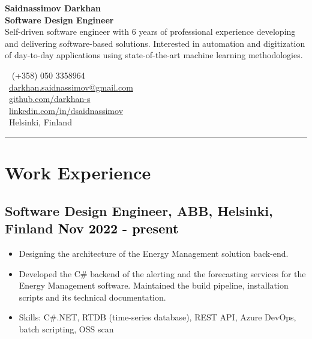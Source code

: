 \documentclass[a4paper,10pt]{article}
\begin{document}

\noindent
\begin{minipage}[t]{0.65\textwidth} %
    {\color{darkblue}\textbf{\LARGE Saidnassimov Darkhan}} \\[0.2cm]
    \textbf{\large Software Design Engineer} \\[0.2cm]
    Self-driven software engineer with 6 years of professional experience developing and delivering software-based solutions. Interested in automation and digitization of day-to-day applications using state-of-the-art machine learning methodologies.
\end{minipage}
\hfill
\begin{minipage}[t]{0.32\textwidth} %
    \vspace{0.5cm} 
    \raggedleft 
    \footnotesize 
    \faBriefcase\ \; (+358) 050 3358964 \\[0.2cm]  
    \faEnvelope\ \href{mailto:darkhan.saidnassimov@gmail.com}{\mbox{darkhan.saidnassimov@gmail.com}} \\[0.2cm]
    \faGithub\ \href{https://github.com/darkhan-s}{\mbox{github.com/darkhan-s}} \\[0.2cm]
    \faLinkedin\ \href{https://www.linkedin.com/in/dsaidnassimov/}{\mbox{linkedin.com/in/dsaidnassimov}} \\[0.2cm]
    \faMapMarker\ Helsinki, Finland
\end{minipage}

\vspace{0.2cm}
\hrule
\vspace{0.1cm}

\section*{Work Experience}
\subsection*{Software Design Engineer, ABB, Helsinki, Finland \hfill \textcolor{black}{Nov 2022 - present}}
\begin{itemize}
    \item Designing the architecture of the Energy Management solution back-end.
    \item Developed the C\# backend of the alerting and the forecasting services for the Energy Management software. Maintained the build pipeline, installation scripts and its technical documentation.
    \item Skills: C\#.NET, RTDB (time-series database), REST API, Azure DevOps, batch scripting, OSS scan
\end{itemize}
\end{document}
